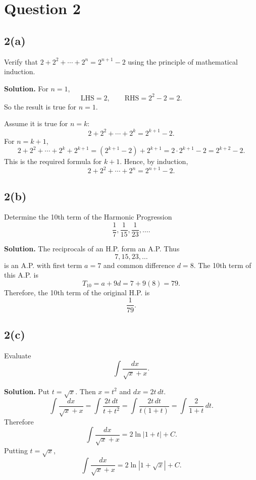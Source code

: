 \documentclass[11pt,a4paper]{article}
\newcommand{\ans}{\textbf{Solution.} }
\newcommand{\final}[1]{\[\boxed{#1}\]}
\begin{document}
\section*{Question 2}

\subsection*{2(a)}
\begin{questionbox}
Verify that $2+2^2+\cdots+2^n=2^{n+1}-2$ using the principle of mathematical induction.
\end{questionbox}
\ans
For $n=1$,
\[
\text{LHS}=2,
\qquad
\text{RHS}=2^{2}-2=2.
\]
So the result is true for $n=1$.

Assume it is true for $n=k$:
\[
2+2^2+\cdots+2^k=2^{k+1}-2.
\]
For $n=k+1$,
\[
2+2^2+\cdots+2^k+2^{k+1}
=(2^{k+1}-2)+2^{k+1}
=2\cdot 2^{k+1}-2
=2^{k+2}-2.
\]
This is the required formula for $k+1$. Hence, by induction,
\final{2+2^2+\cdots+2^n=2^{n+1}-2.}

\subsection*{2(b)}
\begin{questionbox}
Determine the 10th term of the Harmonic Progression
\[
\frac17,\frac1{15},\frac1{23},\ldots.
\]
\end{questionbox}
\ans
The reciprocals of an H.P. form an A.P. Thus
\[
7,15,23,\ldots
\]
is an A.P. with first term $a=7$ and common difference $d=8$.
The 10th term of this A.P. is
\[
T_{10}=a+9d=7+9(8)=79.
\]
Therefore, the 10th term of the original H.P. is
\final{\frac1{79}.}

\subsection*{2(c)}
\begin{questionbox}
Evaluate
\[
\int \frac{dx}{\sqrt{x}+x}.
\]
\end{questionbox}
\ans
Put $t=\sqrt{x}$. Then $x=t^2$ and $dx=2t\,dt$.
\[
\int \frac{dx}{\sqrt{x}+x}
=\int \frac{2t\,dt}{t+t^2}
=\int \frac{2t\,dt}{t(1+t)}
=\int \frac{2}{1+t}\,dt.
\]
Therefore
\[
\int \frac{dx}{\sqrt{x}+x}=2\ln|1+t|+C.
\]
Putting $t=\sqrt{x}$,
\final{\int \frac{dx}{\sqrt{x}+x}=2\ln|1+\sqrt{x}|+C.}
\end{document}
